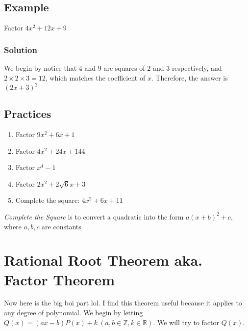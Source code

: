 \documentclass{article}
\begin{document}
\subsection{Example}
\begin{tcolorbox}
    Factor $4x^2+12x+9$
\end{tcolorbox}
\subsubsection{Solution}
We begin by notice that $4$ and $9$ are squares of $2$ and $3$ respectively, and $2\times 2\times 3 = 12$, which matches the coefficient of $x$. Therefore, the answer is $\left(2x+3\right)^2$


\subsection{Practices}
\begin{enumerate}
    \item Factor $9x^2+6x+1$
    \item Factor $4x^2+24x+144$
    \item Factor $x^4-1$
    \item Factor $2x^2+2\sqrt{6}x+3$
    \item Complete the square: $4x^2+6x+11$
\end{enumerate}
\parindent \emph{Complete the Square} is to convert a quadratic into the form $a(x+b)^2+c$, where $a,b,c$ are constants


\pagebreak
\section{Rational Root Theorem aka. Factor Theorem}
Now here is the big boi part lol. I find this theorem useful because it applies to any degree of polynomial. We begin by letting $Q(x)=(ax-b)P(x)+k\ \left(a,b\in \mathbb{Z},k\in \mathbb{R}\right)$. We will try to factor $Q(x)$.
\end{document}
